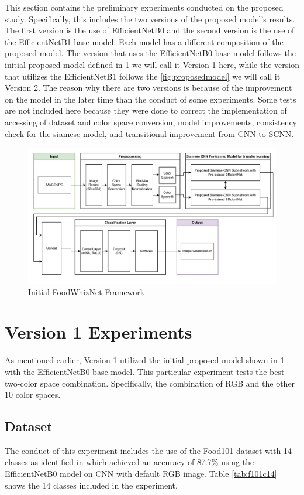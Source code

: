This section contains the preliminary experiments conducted on the proposed study. Specifically, this includes the two versions of the proposed model's results. The first version is the use of EfficientNetB0 and the second version is the use of the EfficientNetB1 base model. Each model has a different composition of the proposed model. The version that uses the EfficientNetB0 base model follows the initial proposed model defined in \ref{fig:initproposedmodel} we will call it Version 1 here, while the version that utilizes the EfficientNetB1 follows the \ref{fig:proposedmodel} we will call it Version 2. The reason why there are two versions is because of the improvement on the model in the later time than the conduct of some experiments. Some tests are not included here because they were done to correct the implementation of accessing of dataset and color space conversion, model improvements, consistency check for the siamese model, and transitional improvement from CNN to SCNN. 

\begin{figure}[h]
	\centering
	\includegraphics[width=1.0\textwidth]{graphics/images/Proposed_Model-old.pdf}
	\caption{Initial FoodWhizNet Framework}
	\label{fig:initproposedmodel}
\end{figure}

\section{Version 1 Experiments}
As mentioned earlier, Version 1 utilized the initial proposed model shown in \ref{fig:initproposedmodel} with the EfficientNetB0 base model. This particular experiment tests the best two-color space combination. Specifically, the combination of RGB and the other 10 color spaces.
\subsection{Dataset}
The conduct of this experiment includes the use of the Food101 dataset with 14 classes as identified in \cite{kaur-2023} which achieved an accuracy of 87.7\% using the EfficientNetB0 model on CNN with default RGB image. Table \ref{tab:f101c14} shows the 14 classes included in the experiment.


